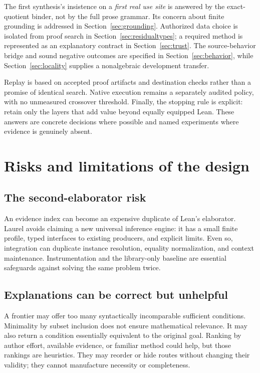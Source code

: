 \documentclass[11pt,a4paper]{article}
\theoremstyle{definition}
\theoremstyle{remark}
\begin{document}
The first synthesis's insistence on a \emph{first real use site} is answered by the exact-quotient binder, not by the full prose grammar. Its concern about finite grounding is addressed in Section~\ref{sec:grounding}. Authorized data choice is isolated from proof search in Section~\ref{sec:residualtypes}; a required method is represented as an explanatory contract in Section~\ref{sec:trust}. The source-behavior bridge and sound negative outcomes are specified in Section~\ref{sec:behavior}, while Section~\ref{sec:locality} supplies a nonalgebraic development transfer.

Replay is based on accepted proof artifacts and destination checks rather than a promise of identical search. Native execution remains a separately audited policy, with no unmeasured crossover threshold. Finally, the stopping rule is explicit: retain only the layers that add value beyond equally equipped Lean. These answers are concrete decisions where possible and named experiments where evidence is genuinely absent.

\section{Risks and limitations of the design}
\subsection{The second-elaborator risk}
An evidence index can become an expensive duplicate of Lean's elaborator. Laurel avoids claiming a new universal inference engine: it has a small finite profile, typed interfaces to existing producers, and explicit limits. Even so, integration can duplicate instance resolution, equality normalization, and context maintenance. Instrumentation and the library-only baseline are essential safeguards against solving the same problem twice.

\subsection{Explanations can be correct but unhelpful}
A frontier may offer too many syntactically incomparable sufficient conditions. Minimality by subset inclusion does not ensure mathematical relevance. It may also return a condition essentially equivalent to the original goal. Ranking by author effort, available evidence, or familiar method could help, but those rankings are heuristics. They may reorder or hide routes without changing their validity; they cannot manufacture necessity or completeness.
\end{document}
